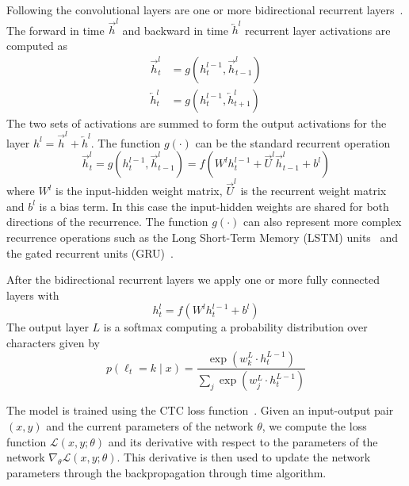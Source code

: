 Following the convolutional layers are one or more bidirectional recurrent
layers~\cite{schuster1997bidirectional}. The forward in time
$\overrightarrow{h}^l$ and backward in time $\overleftarrow{h}^l$ recurrent
layer activations are computed as
\begin{equation*}
\begin{aligned}
    \overrightarrow{h}_t^l &= g( h_t^{l-1}, \overrightarrow{h}_{t-1}^l ) \\
    \overleftarrow{h}_t^l &= g( h_t^{l-1}, \overleftarrow{h}_{t+1}^l )
\end{aligned}
\end{equation*}
The two sets of activations are summed to form the output activations for the
layer $h^l = \overrightarrow{h}^l + \overleftarrow{h}^l$.  The function
$g(\cdot)$ can be the standard recurrent operation
\begin{equation}
    \overrightarrow{h}_t^l = g( h_t^{l-1}, \overrightarrow{h}_{t-1}^l )
        = f( W^l h_t^{l-1} + \overrightarrow{U}^l \overrightarrow{h}_{t-1}^l + b^l )
    \label{eq:scaling_asr:plainrnn}
\end{equation}
where $W^l$ is the input-hidden weight matrix, $\overrightarrow{U}^l$ is the
recurrent weight matrix and $b^l$ is a bias term. In this case the input-hidden
weights are shared for both directions of the recurrence. The function
$g(\cdot)$ can also represent more complex recurrence operations such as the
Long Short-Term Memory (LSTM) units~\cite{hochreiter1997} and the gated
recurrent units (GRU)~\cite{cho2014}.

After the bidirectional recurrent layers we apply one or more fully connected layers with
\begin{equation*}
    h^l_t = f( W^l h^{l-1}_t + b^l )
\end{equation*}
The output layer $L$ is a softmax computing a probability distribution over characters given by
\begin{equation*}
    p(\ell_t=k \mid x) = \frac{\exp(w^L_k \cdot h^{L-1}_t)}{\sum_j \exp(w^L_j \cdot h^{L-1}_t)}
\end{equation*}

The model is trained using the CTC loss function~\cite{graves2006}. Given an
input-output pair $(x, y)$ and the current parameters of the network $\theta$,
we compute the loss function $\mathcal{L}(x, y; \theta)$ and its derivative
with respect to the parameters of the network $\nabla_\theta \mathcal{L}(x, y;
\theta)$. This derivative is then used to update the network parameters through
the backpropagation through time algorithm.

